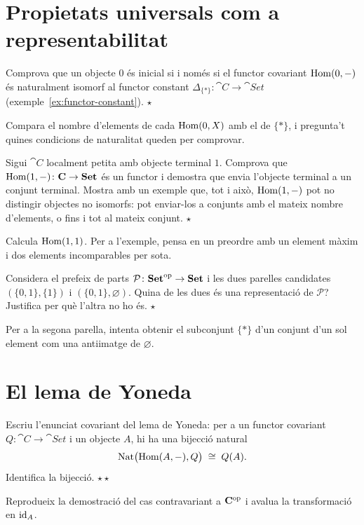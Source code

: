 \section{Propietats universals com a representabilitat}

\begin{exercici}
Comprova que un objecte $0$ és inicial si i només si el functor covariant $\operatorname{Hom}(0,-)$ és naturalment isomorf al functor constant $\Delta_{\{\ast\}}\colon\cat{C}\to\cat{Set}$ (exemple~\ref{ex:functor-constant}). \hfill{\normalfont$\star$}
\begin{indicacio}
Compara el nombre d'elements de cada $\operatorname{Hom}(0,X)$ amb el de $\{\ast\}$, i pregunta't quines condicions de naturalitat queden per comprovar.
\end{indicacio}
\end{exercici}

\begin{exercici}
Sigui $\cat{C}$ localment petita amb objecte terminal $1$. Comprova que $\operatorname{Hom}(1,-)\colon\mathbf{C}\to\mathbf{Set}$ és un functor i demostra que envia l'objecte terminal a un conjunt terminal. Mostra amb un exemple que, tot i això, $\operatorname{Hom}(1,-)$ pot no distingir objectes no isomorfs: pot enviar-los a conjunts amb el mateix nombre d'elements, o fins i tot al mateix conjunt. \hfill{\normalfont$\star$}
\begin{indicacio}
Calcula $\operatorname{Hom}(1,1)$. Per a l'exemple, pensa en un preordre amb un element màxim i dos elements incomparables per sota.
\end{indicacio}
\end{exercici}

\begin{exercici}
Considera el prefeix de parts $\mathcal P\colon\mathbf{Set}^{\mathrm{op}}\to\mathbf{Set}$ i les dues parelles candidates $(\{0,1\},\{1\})$ i $(\{0,1\},\varnothing)$. Quina de les dues és una representació de $\mathcal P$? Justifica per què l'altra no ho és. \hfill{\normalfont$\star$}
\begin{indicacio}
Per a la segona parella, intenta obtenir el subconjunt $\{\ast\}$ d'un conjunt d'un sol element com una antiimatge de $\varnothing$.
\end{indicacio}
\end{exercici}

\section{El lema de Yoneda}

\begin{exercici}
Escriu l'enunciat covariant del lema de Yoneda: per a un functor covariant $Q\colon\cat{C}\to\cat{Set}$ i un objecte $A$, hi ha una bijecció natural
\[
\operatorname{Nat}\bigl(\operatorname{Hom}(A,-),Q\bigr)\;\cong\;Q(A).
\]
Identifica la bijecció. \hfill{\normalfont$\star\star$}
\begin{indicacio}
Reprodueix la demostració del cas contravariant a $\mathbf{C}^{\mathrm{op}}$ i avalua la transformació en $\operatorname{id}_A$.
\end{indicacio}
\end{exercici}

